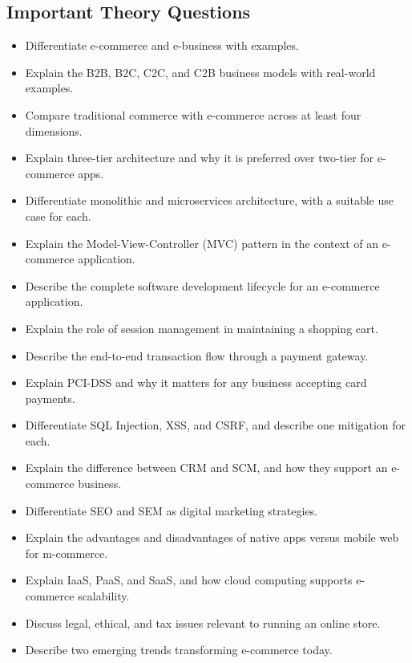 \documentclass[11pt,a4paper]{article}
\begin{document}
\subsection{Important Theory Questions}
\begin{itemize}[leftmargin=*]
  \item Differentiate e-commerce and e-business with examples.
  \item Explain the B2B, B2C, C2C, and C2B business models with real-world examples.
  \item Compare traditional commerce with e-commerce across at least four dimensions.
  \item Explain three-tier architecture and why it is preferred over two-tier for e-commerce apps.
  \item Differentiate monolithic and microservices architecture, with a suitable use case for each.
  \item Explain the Model-View-Controller (MVC) pattern in the context of an e-commerce application.
  \item Describe the complete software development lifecycle for an e-commerce application.
  \item Explain the role of session management in maintaining a shopping cart.
  \item Describe the end-to-end transaction flow through a payment gateway.
  \item Explain PCI-DSS and why it matters for any business accepting card payments.
  \item Differentiate SQL Injection, XSS, and CSRF, and describe one mitigation for each.
  \item Explain the difference between CRM and SCM, and how they support an e-commerce business.
  \item Differentiate SEO and SEM as digital marketing strategies.
  \item Explain the advantages and disadvantages of native apps versus mobile web for m-commerce.
  \item Explain IaaS, PaaS, and SaaS, and how cloud computing supports e-commerce scalability.
  \item Discuss legal, ethical, and tax issues relevant to running an online store.
  \item Describe two emerging trends transforming e-commerce today.
\end{itemize}
\end{document}
